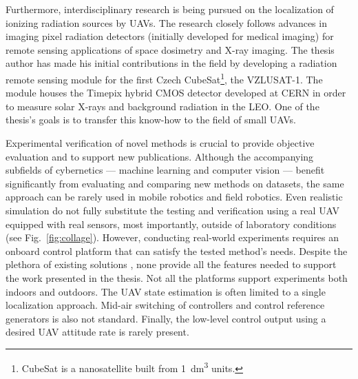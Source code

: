 \documentclass[a4paper,11pt,twoside,openright]{book}
\newcommand{\reffig}[1]{Fig.~\ref{#1}}
\begin{document}
Furthermore, interdisciplinary research is being pursued on the localization of ionizing radiation sources by \acp{UAV}.
The research closely follows advances in imaging pixel radiation detectors (initially developed for medical imaging) for remote sensing applications of space dosimetry and X-ray imaging.
The thesis author has made his initial contributions in the field by developing a radiation remote sensing module for the first Czech CubeSat\footnote{CubeSat is a nanosatellite built from \SI{1}{\deci\meter\cubed} units.}, the \acs{VZLU}SAT-1.
The module houses the Timepix \cite{llopart2007timepix} hybrid \acs{CMOS} detector developed at CERN in order to measure solar X-rays and background radiation in the \ac{LEO}.
One of the thesis's goals is to transfer this know-how to the field of small \aclp{UAV}.

Experimental verification of novel methods is crucial to provide objective evaluation and to support new publications.
Although the accompanying subfields of cybernetics --- machine learning and computer vision --- benefit significantly from evaluating and comparing new methods on datasets, the same approach can be rarely used in mobile robotics and field robotics.
Even realistic simulation do not fully substitute the testing and verification using a real \ac{UAV} equipped with real sensors, most importantly, outside of laboratory conditions (see \reffig{fig:collage}).
However, conducting real-world experiments requires an onboard control platform that can satisfy the tested method's needs.
Despite the plethora of existing solutions \cite{sanchez2016aerostack, xiao2020xtdrone, furrer2016rotors, schmittle2018openuav, abeywardena2015design, mellado2013mavwork}, none provide all the features needed to support the work presented in the thesis.
Not all the platforms support experiments both indoors and outdoors.
The \ac{UAV} state estimation is often limited to a single localization approach.
Mid-air switching of controllers and control reference generators is also not standard.
Finally, the low-level control output using a desired \ac{UAV} attitude rate is rarely present.

\end{document}
